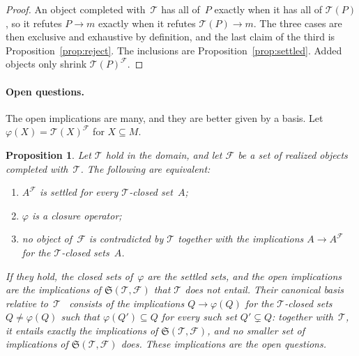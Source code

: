 \documentclass[11pt,a4paper]{article}
\newtheorem{proposition}{Proposition}
\theoremstyle{definition}
\theoremstyle{remark}
\begin{document}
\begin{proof}
An object completed with~$\mathcal{T}$ has all of~$P$ exactly when it has all of $\mathcal{T}(P)$, so it refutes $P \to m$ exactly when it refutes $\mathcal{T}(P) \to m$. The three cases are then exclusive and exhaustive by definition, and the last claim of the third is Proposition~\ref{prop:reject}. The inclusions are Proposition~\ref{prop:settled}. Added objects only shrink $\mathcal{T}(P)^{\mathcal{F}}$.
\end{proof}

\paragraph{Open questions.}
The open implications are many, and they are better given by a basis. Let $\varphi(X) = \mathcal{T}(X)^{\mathcal{F}}$ for $X \subseteq M$.

\begin{proposition}\label{prop:open}
Let $\mathcal{T}$ hold in the domain, and let $\mathcal{F}$ be a set of realized objects completed with~$\mathcal{T}$. The following are equivalent:
\begin{enumerate}
  \item $A^{\mathcal{F}}$ is settled for every $\mathcal{T}$-closed set~$A$;
  \item $\varphi$ is a closure operator;
  \item no object of~$\mathcal{F}$ is contradicted by $\mathcal{T}$ together with the implications $A \to A^{\mathcal{F}}$ for the $\mathcal{T}$-closed sets~$A$.
\end{enumerate}
If they hold, the closed sets of~$\varphi$ are the settled sets, and the open implications are the implications of $\mathfrak{S}(\mathcal{T}, \mathcal{F})$ that $\mathcal{T}$ does not entail. Their canonical basis relative to~$\mathcal{T}$~\cite{GO16} consists of the implications $Q \to \varphi(Q)$ for the $\mathcal{T}$-closed sets $Q \neq \varphi(Q)$ such that $\varphi(Q') \subseteq Q$ for every such set $Q' \subsetneq Q$: together with~$\mathcal{T}$, it entails exactly the implications of $\mathfrak{S}(\mathcal{T}, \mathcal{F})$, and no smaller set of implications of $\mathfrak{S}(\mathcal{T}, \mathcal{F})$ does. These implications are the \emph{open questions}.
\end{proposition}
\end{document}
